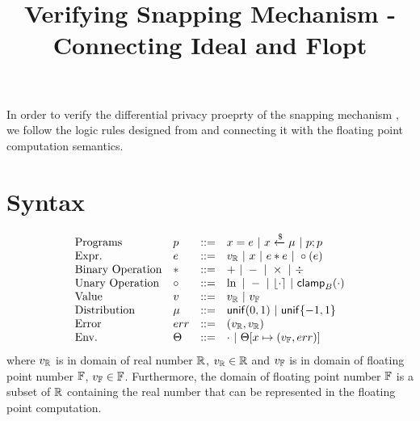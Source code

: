 \documentclass[a4paper,11pt]{article}
\begin{document}
\title{Verifying Snapping Mechanism - Connecting Ideal and Flopt}
\author{}

\date{}

\maketitle
In order to verify the differential privacy proeprty of
the snapping mechanism \cite{mironov2012significance},
we follow the logic rules designed from
\cite{barthe2016proving} and connecting 
it with the floating point computation semantics.
\section{Syntax}
\[\begin{array}{llll}
\mbox{Programs} & \prog & ::= & 
     \varx = \expr ~|~ \varx \samplel \edistr
	~|~ \prog ; \prog \\

\mbox{Expr.} & \expr & ::= & \rval 
	~|~ \varx  ~|~ \expr \bop \expr
	~|~ \uop (\expr) \\
%
\mbox{Binary Operation} & \bop & ::= & + ~|~ - ~|~ \times ~|~ \div \\
%
\mbox{Unary Operation} & \uop & ::= & \ln ~|~ - ~|~ \round{\cdot} 
	~|~ \clamp_B(\cdot) \\
%
\mbox{Value} & \valv & ::= & \rval ~|~  \fval \\
%
\mbox{Distribution} & \edistr & ::= & \uniform(0, 1) 
%
	~|~ \uniform\{-1, 1\}\\ 
%
\mbox{Error} & \err & ::= & (\rval, \rval) \\
%
\mbox{Env.} & \trsenv & ::= & \cdot ~|~ \trsenv[x \mapsto (\fval, \err)] 
\end{array}
\]
where $v_{\mathbb{R}}$ is in domain of real number $\mathbb{R}$, $v_{\mathbb{R}} \in \mathbb{R}$ and $v_{\mathbb{F}}$ is in domain of floating point number $\mathbb{F}$, $v_{\mathbb{F}} \in \mathbb{F}$. Furthermore, the domain of floating point number $\mathbb{F}$ is a subset of $\mathbb{R}$ containing the real number that can be represented in the floating point computation.
\end{document}
